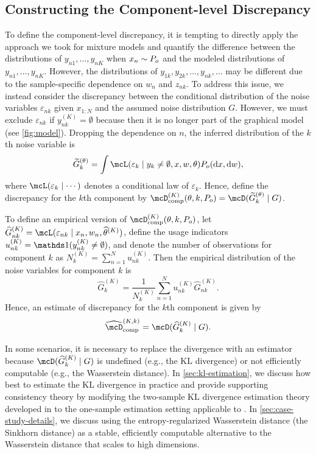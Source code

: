 \subsection{Constructing the Component-level Discrepancy}

To define the component-level discrepancy, it is tempting to directly apply the approach we took for mixture models
and quantify the difference between the distributions of $y_{n1},\dots,y_{nK}$ when $x_n \sim P_o$ and the modeled distributions of $y_{n1},\dots,y_{nK}$.
However, the distributions of $y_{1k}, y_{2k}, \dots, y_{nk}, \dots$ may be different due to the sample-specific dependence on $w_n$ and $z_{nk}$.
To address this issue, we instead consider the discrepancy between the conditional distribution of the noise variables $\varepsilon_{nk}$ given $x_{1:N}$ and the assumed noise distribution $G$.
However, we must exclude $\varepsilon_{nk}$ if $y^{(K)}_{nk} = \emptyset$ because then it is no longer part of the graphical model (see \cref{fig:model}).
Dropping the dependence on $n$, the inferred distribution of the $k$th noise variable is
\[
\widetilde{G}_k^{(\theta)} = \int \mcL(\veps_{k} \mid y_k \ne \emptyset, x, w, \theta) P_o(\d x, \d w),
\]
where $\mcL(\veps_{k} \mid \cdots)$ denotes a conditional law of $\varepsilon_k$. 
Hence, define the discrepancy for the $k$th component by $\compDisc^{(K)}(\theta, k, P_o) = \discr{\widetilde G_k^{(\theta)}}{G}$.

To define an empirical version of $\compDisc^{(K)}(\theta, k, P_o)$, let
$\widehat G_{nk}^{(K)} = \mcL(\varepsilon_{nk} \mid x_n, w_n, \widehat\theta^{(K)})$, 
define the usage indicators $u_{nk}^{(K)} = \ind(y_{nk}^{(K)} \ne \emptyset)$, and denote the number of observations for component $k$ as $N_k^{(K)} = \sum_{n=1}^N u_{nk}^{(K)}$.
Then the empirical distribution of the noise variables for component $k$ is
\[
	\widehat G_k^{(K)} = \frac{1}{N_k^{(K)}} \sum_{n=1}^N u_{nk}^{(K)} \widehat G_{nk}^{(K)}.
\]
Hence, an estimate of discrepancy for the $k$th component is given by 
\[ \label{eq:general-Dcomp}
\compDiscEst^{(K,k)} = \discr{\widehat G_k^{(K)}}{G}.
\]

In some scenarios, it is necessary to replace the divergence with an estimator because 
$\discr{\widehat G_k^{(K)}}{G}$ is undefined (e.g., the KL divergence) or not efficiently computable (e.g., the Wasserstein distance).
In \cref{sec:kl-estimation}, we discuss how best to estimate the KL divergence in practice and provide supporting
consistency theory by modifying the two-sample KL divergence estimation theory developed in \citet{Wang:2009} to the one-sample estimation setting applicable to \methodname. 
In \cref{sec:case-study-details}, we discuss using the entropy-regularized Wasserstein distance (the Sinkhorn distance) 
as a stable, efficiently computable alternative to the Wasserstein distance that scales to high dimensions. 

